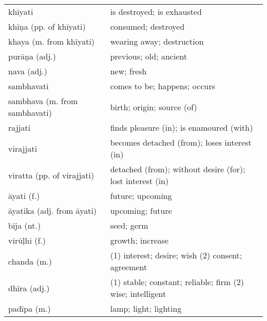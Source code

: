 \documentclass[11pt,oneside]{memoir}
\begin{document}
\begin{longtable}{L{\colOne} L{\colTwo}}
khīyati & is destroyed; is exhausted\\[0pt]
khīṇa (pp. of khīyati) & consumed; destroyed\\[0pt]
khaya (m. from khīyati) & wearing away; destruction\\[0pt]
purāṇa (adj.) & previous; old; ancient\\[0pt]
nava (adj.) & new; fresh\\[0pt]
sambhavati & comes to be; happens; occurs\\[0pt]
sambhava (m. from sambhavati) & birth; origin; source (of)\\[0pt]
rajjati & finds pleasure (in); is enamoured (with)\\[0pt]
virajjati & becomes detached (from); loses interest (in)\\[0pt]
viratta (pp. of virajjati) & detached (from); without desire (for); lost interest (in)\\[0pt]
āyati (f.) & future; upcoming\\[0pt]
āyatika (adj. from āyati) & upcoming; future\\[0pt]
bīja (nt.) & seed; germ\\[0pt]
virūḷhi (f.) & growth; increase\\[0pt]
chanda (m.) & (1) interest; desire; wish (2) consent; agreement\\[0pt]
dhīra (adj.) & (1) stable; constant; reliable; firm (2) wise; intelligent\\[0pt]
padīpa (m.) & lamp; light; lighting\\[0pt]
\end{longtable}
\end{document}
